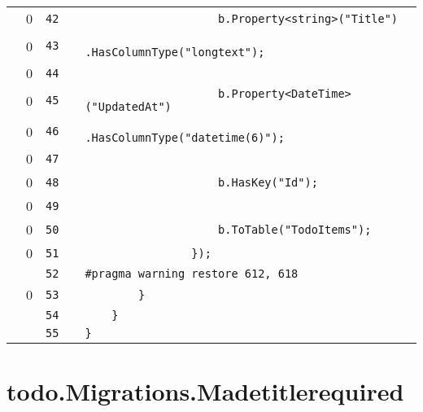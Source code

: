 \documentclass[a4paper,landscape,10pt]{article}
\begin{document}
\begin{longtable}[l]{lrrll}
\cellcolor{red} & 0 & \verb~42~ & & \verb~                    b.Property<string>("Title")~\\
\cellcolor{red} & 0 & \verb~43~ & & \verb~                        .HasColumnType("longtext");~\\
\cellcolor{red} & 0 & \verb~44~ & & \verb~~\\
\cellcolor{red} & 0 & \verb~45~ & & \verb~                    b.Property<DateTime>("UpdatedAt")~\\
\cellcolor{red} & 0 & \verb~46~ & & \verb~                        .HasColumnType("datetime(6)");~\\
\cellcolor{red} & 0 & \verb~47~ & & \verb~~\\
\cellcolor{red} & 0 & \verb~48~ & & \verb~                    b.HasKey("Id");~\\
\cellcolor{red} & 0 & \verb~49~ & & \verb~~\\
\cellcolor{red} & 0 & \verb~50~ & & \verb~                    b.ToTable("TodoItems");~\\
\cellcolor{red} & 0 & \verb~51~ & & \verb~                });~\\
\cellcolor{gray} &  & \verb~52~ & & \verb~#pragma warning restore 612, 618~\\
\cellcolor{red} & 0 & \verb~53~ & & \verb~        }~\\
\cellcolor{gray} &  & \verb~54~ & & \verb~    }~\\
\cellcolor{gray} &  & \verb~55~ & & \verb~}~\\
\end{longtable}
\newpage
\section{todo.Migrations.Madetitlerequired}
\end{document}
